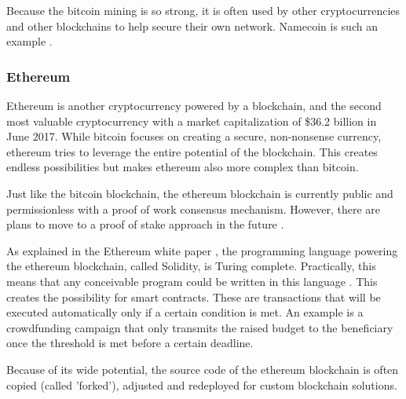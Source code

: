 Because the bitcoin mining is so strong, it is often used by other cryptocurrencies and other blockchains to help secure their own network. Namecoin is such an example \cite{namecoin-whitepaper}.

\subsubsection{Ethereum}

Ethereum is another cryptocurrency powered by a blockchain, and the second most valuable cryptocurrency with a market capitalization of \$36.2 billion in June 2017. While bitcoin focuses on creating a secure, non-nonsense currency, ethereum tries to leverage the entire potential of the blockchain. This creates endless possibilities but makes ethereum also more complex than bitcoin.

Just like the bitcoin blockchain, the ethereum blockchain is currently public and permissionless with a proof of work consensus mechanism. However, there are plans to move to a proof of stake approach in the future \cite{ethereum-pos-faq}. 

As explained in the Ethereum white paper \cite{ethereum-whitepaper}, the programming language powering the ethereum blockchain, called Solidity, is Turing complete. Practically, this means that any conceivable program could be written in this language \cite{definition-turing-completeness}. This creates the possibility for smart contracts. These are transactions that will be executed automatically only if a certain condition is met. An example is a crowdfunding campaign that only transmits the raised budget to the beneficiary once the threshold is met before a certain deadline.

Because of its wide potential, the source code of the ethereum blockchain is often copied (called 'forked'), adjusted and redeployed for custom blockchain solutions. 


